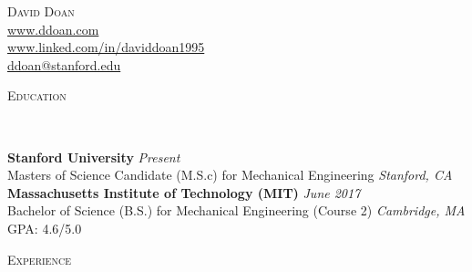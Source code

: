 \documentclass[9pt]{article}
\newenvironment{changemargin}[2]{%
  \begin{list}{}{%
    \setlength{\topsep}{0pt}%
    \setlength{\leftmargin}{#1}%
    \setlength{\rightmargin}{#2}%
    \setlength{\listparindent}{\parindent}%
    \setlength{\itemindent}{\parindent}%
    \setlength{\parsep}{\parskip}%
  }%
  \item[]}{\end{list}
}
\newcommand{\lineover}{
	\begin{changemargin}{-0.05in}{-0.05in}
		\vspace*{-8pt}
		\hrulefill \\
		\vspace*{-2pt}
	\end{changemargin}
}
\newcommand{\header}[1]{
	\begin{changemargin}{-0.5in}{-0.5in}
		\scshape{#1}\\
  	\lineover
	\end{changemargin}
}
\newcommand{\contact}[4]{
	\begin{changemargin}{-0.5in}{-0.5in}
		\begin{center}
			{\Large \scshape {#1}}\\ \smallskip
      {\url{#2}}\\ \smallskip
			{\url{#3}}\\ \smallskip
			{\url{#4}}\\
		\end{center}
	\end{changemargin}
}
\newenvironment{body} {
	\vspace*{-16pt}
	\begin{changemargin}{-0.25in}{-0.5in}
  }	
	{\end{changemargin}
}
\begin{document}
\contact{David Doan}{www.ddoan.com}{www.linked.com/in/daviddoan1995}{ddoan@stanford.edu}

\header{Education}

\begin{body}
	\vspace{14pt}
	\textbf{Stanford University}{} \hfill \emph{Present}{} \\
	Masters of Science Candidate (M.S.c) for Mechanical Engineering \hfill \emph{Stanford, CA}{} \\
	\medskip
	\textbf{Massachusetts Institute of Technology (MIT)}{} \hfill \emph{June 2017}{} \\
	Bachelor of Science (B.S.) for Mechanical Engineering (Course 2) \hfill \emph{Cambridge, MA}{} \\
	GPA: 4.6/5.0\\
\end{body}
\medskip

\header{Experience}
\end{document}
